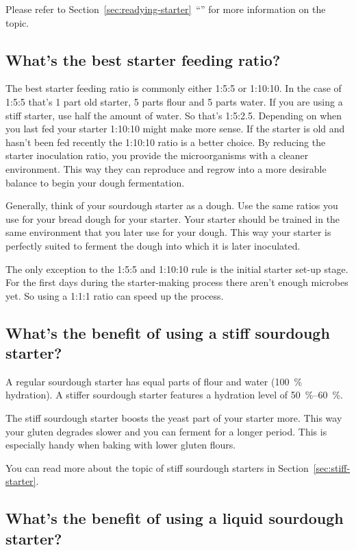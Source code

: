 Please refer to
Section~\ref{sec:readying-starter}~``'' for more
information on the topic.

\subsection{What's the best starter feeding ratio?}

The best starter feeding ratio is commonly either 1:5:5 or 1:10:10.
In the case of 1:5:5 that's 1 part old starter,
5 parts flour and 5 parts water. If you are using a stiff starter,
use half the amount of water. So that's 1:5:2.5. Depending on when
you last fed your starter 1:10:10 might make more sense. If the starter
is old and hasn't been fed recently the 1:10:10 ratio is a better choice.
By reducing the starter inoculation ratio, you provide the microorganisms
with a cleaner environment. This way they can reproduce and regrow
into a more desirable balance to begin your dough fermentation.

Generally, think of your sourdough starter as a dough. Use the same
ratios you use for your bread dough for your starter. Your starter
should be trained in the same environment that you later use
for your dough. This way your starter is perfectly suited to
ferment the dough into which it is later inoculated.

The only exception to the 1:5:5 and 1:10:10 rule is the initial
starter set-up stage. For the first days during the starter-making
process there aren't enough microbes yet. So using a 1:1:1 ratio
can speed up the process.
\subsection{What's the benefit of using a stiff sourdough starter?}

A regular sourdough starter has equal parts of flour and water
(\qty{100}{\percent} hydration). A stiffer sourdough starter features a
hydration level of \qtyrange{50}{60}{\percent}.

The stiff sourdough starter boosts the yeast part
of your starter more. This way your gluten degrades
slower and you can ferment for a longer period. This
is especially handy when baking with lower gluten flours.

You can read more about the topic of stiff sourdough
starters in Section~\ref{sec:stiff-starter}.

\subsection{What's the benefit of using a liquid sourdough starter?}

